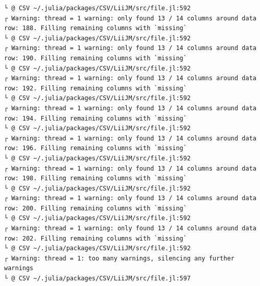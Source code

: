 \documentclass[
  letterpaper,
  DIV=11,
  numbers=noendperiod]{scrartcl}
\begin{document}
\begin{verbatim}
└ @ CSV ~/.julia/packages/CSV/LiiJM/src/file.jl:592
┌ Warning: thread = 1 warning: only found 13 / 14 columns around data row: 188. Filling remaining columns with `missing`
└ @ CSV ~/.julia/packages/CSV/LiiJM/src/file.jl:592
┌ Warning: thread = 1 warning: only found 13 / 14 columns around data row: 190. Filling remaining columns with `missing`
└ @ CSV ~/.julia/packages/CSV/LiiJM/src/file.jl:592
┌ Warning: thread = 1 warning: only found 13 / 14 columns around data row: 192. Filling remaining columns with `missing`
└ @ CSV ~/.julia/packages/CSV/LiiJM/src/file.jl:592
┌ Warning: thread = 1 warning: only found 13 / 14 columns around data row: 194. Filling remaining columns with `missing`
└ @ CSV ~/.julia/packages/CSV/LiiJM/src/file.jl:592
┌ Warning: thread = 1 warning: only found 13 / 14 columns around data row: 196. Filling remaining columns with `missing`
└ @ CSV ~/.julia/packages/CSV/LiiJM/src/file.jl:592
┌ Warning: thread = 1 warning: only found 13 / 14 columns around data row: 198. Filling remaining columns with `missing`
└ @ CSV ~/.julia/packages/CSV/LiiJM/src/file.jl:592
┌ Warning: thread = 1 warning: only found 13 / 14 columns around data row: 200. Filling remaining columns with `missing`
└ @ CSV ~/.julia/packages/CSV/LiiJM/src/file.jl:592
┌ Warning: thread = 1 warning: only found 13 / 14 columns around data row: 202. Filling remaining columns with `missing`
└ @ CSV ~/.julia/packages/CSV/LiiJM/src/file.jl:592
┌ Warning: thread = 1: too many warnings, silencing any further warnings
└ @ CSV ~/.julia/packages/CSV/LiiJM/src/file.jl:597
\end{verbatim}
\end{document}
